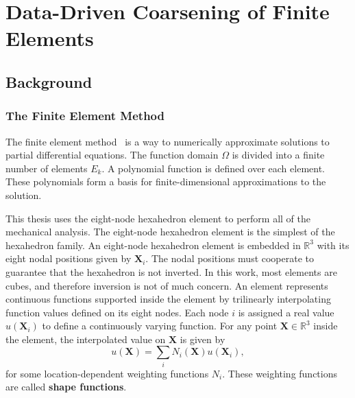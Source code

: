\chapter{Data-Driven Coarsening of Finite Elements}
\label{ch2:ddfem}
\section{Background}
\subsection{The Finite Element Method}
The finite element method~\citep{ciarlet2002finite} is a way to numerically approximate solutions to partial differential equations.
The function domain $\Omega$ is divided into a finite number of elements $E_k$.
A polynomial function is defined over each element.
These polynomials form a basis for finite-dimensional approximations to the solution.

This thesis uses the eight-node hexahedron element to perform all of the mechanical analysis.
The eight-node hexahedron element is the simplest of the hexahedron family.
An eight-node hexahedron element is embedded in $\mathbb{R}^3$ with its eight nodal positions given by $\mathbf{X}_i$.
The nodal positions must cooperate to guarantee that the hexahedron is not inverted.
In this work, most elements are cubes, and therefore inversion is not of much concern.
An element represents continuous functions supported inside the element by trilinearly interpolating function values defined on its eight nodes.
Each node $i$ is assigned a real value $u(\mathbf{X}_i)$ to define a continuously varying function.
For any point $\mathbf{X}\in\mathbb{R}^3$ inside the element,
the interpolated value on $\mathbf{X}$ is given by
\[
u(\mathbf{X})=\sum_i N_i(\mathbf{X})u(\mathbf{X}_i),
\]
for some location-dependent weighting functions $N_i$.
These weighting functions are called \textbf{shape functions}.

